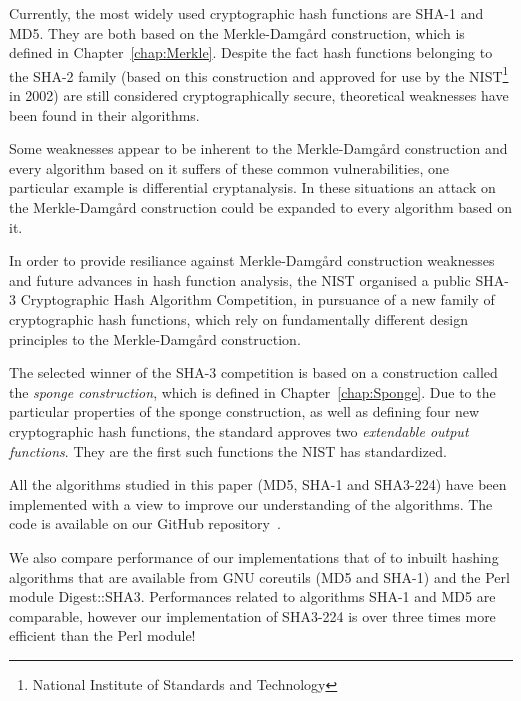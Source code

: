 Currently, the most widely used cryptographic hash functions are \textsc{SHA-1} and \textsc{MD5}. They are both based on the Merkle-Damg\r{a}rd construction, which is defined in Chapter~\ref{chap:Merkle}. Despite the fact hash functions belonging to the \textsc{SHA-2} family (based on this construction and approved for use by the NIST\footnote{National Institute of Standards and Technology} in 2002) are still considered cryptographically secure, theoretical weaknesses have been found in their algorithms.

Some weaknesses appear to be inherent to the Merkle-Damg\r{a}rd construction and every algorithm based on it suffers of these common vulnerabilities, one particular example is differential cryptanalysis. In these situations an attack on the Merkle-Damg\r{a}rd construction could be expanded to every algorithm based on it.

In order to provide resiliance against Merkle-Damg\r{a}rd construction weaknesses and future advances in hash function analysis, the NIST organised a public \textsc{SHA-3} Cryptographic Hash Algorithm Competition, in pursuance of a new family of cryptographic hash functions, which rely on fundamentally different design principles to the Merkle-Damg\r{a}rd construction.

The selected winner of the \textsc{SHA-3} competition is based on a construction called the \emph{sponge construction}, which is defined in Chapter~\ref{chap:Sponge}. Due to the particular properties of the sponge construction, as well as defining four new cryptographic hash functions, the standard approves two \emph{extendable output functions}. They are the first such functions the NIST has standardized.


All the algorithms studied in this paper (MD5, SHA-1 and SHA3-224) have been implemented with a view to improve our understanding of the algorithms.
The code is available on our GitHub repository~\cite{GitLove}.

We also compare performance of our implementations that of to inbuilt hashing algorithms that are available from GNU coreutils (MD5 and SHA-1) and the Perl module Digest::SHA3. Performances related to algorithms SHA-1 and MD5 are comparable, however our implementation of SHA3-224 is over three times more efficient than the Perl module!  
